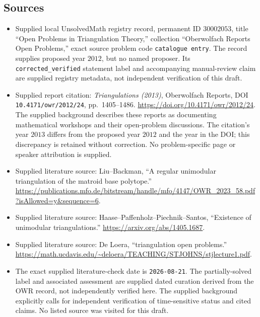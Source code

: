 \documentclass[11pt]{article}
\begin{document}
\subsection{Sources}
\begin{itemize}
\item Supplied local UnsolvedMath registry record, permanent ID \(30002053\), title ``Open Problems in Triangulation Theory,'' collection ``Oberwolfach Reports Open Problems,'' exact source problem code \texttt{catalogue entry}. The record supplies proposed year \(2012\), but no named proposer. Its \texttt{corrected\_verified} statement label and accompanying manual-review claim are supplied registry metadata, not independent verification of this draft.
\item Supplied report citation: \emph{Triangulations (2013)}, Oberwolfach Reports, DOI \texttt{10.4171/owr/2012/24}, pp.\ 1405--1486. \url{https://doi.org/10.4171/owr/2012/24}. The supplied background describes these reports as documenting mathematical workshops and their open-problem discussions. The citation's year \(2013\) differs from the proposed year \(2012\) and the year in the DOI; this discrepancy is retained without correction. No problem-specific page or speaker attribution is supplied.
\item Supplied literature source: Liu--Backman, ``A regular unimodular triangulation of the matroid base polytope.'' \url{https://publications.mfo.de/bitstream/handle/mfo/4147/OWR_2023_58.pdf?isAllowed=y&sequence=6}.
\item Supplied literature source: Haase--Paffenholz--Piechnik--Santos, ``Existence of unimodular triangulations.'' \url{https://arxiv.org/abs/1405.1687}.
\item Supplied literature source: De Loera, ``triangulation open problems.'' \url{https://math.ucdavis.edu/~deloera/TEACHING/STJOHNS/stjlecture1.pdf}.
\item The exact supplied literature-check date is \texttt{2026-08-21}. The partially-solved label and associated assessment are supplied dated curation derived from the OWR record, not independently verified here. The supplied background explicitly calls for independent verification of time-sensitive status and cited claims. No listed source was visited for this draft.
\end{itemize}
\end{document}
